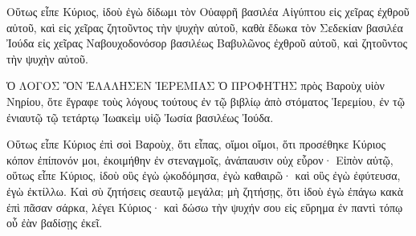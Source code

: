 {Οὕτως εἶπε Κύριος, ἰδοὺ ἐγὼ δίδωμι τὸν Οὐαφρῆ βασιλέα Αἰγύπτου εἰς χεῖρας ἐχθροῦ αὐτοῦ, καὶ εἰς χεῖρας ζητοῦντος τὴν ψυχὴν αὐτοῦ, καθὰ ἔδωκα τὸν Σεδεκίαν βασιλέα Ἰούδα εἰς χεῖρας Ναβουχοδονόσορ βασιλέως Βαβυλῶνος ἐχθροῦ αὐτοῦ, καὶ ζητοῦντος τὴν ψυχὴν αὐτοῦ.
\par }{\PP {}Ὁ ΛΟΓΟΣ ὋΝ ἘΛΑΛΗΣΕΝ ἹΕΡΕΜΙΑΣ Ὁ ΠΡΟΦΗΤΗΣ πρὸς Βαροὺχ υἱὸν Νηρίου, ὅτε ἔγραφε τοὺς λόγους τούτους ἐν τῷ βιβλίῳ ἀπὸ στόματος Ἱερεμίου, ἐν τῷ ἐνιαυτῷ τῷ τετάρτῳ Ἰωακεὶμ υἱῷ Ἰωσία βασιλέως Ἰούδα.
\par }{\PP {}Οὕτως εἶπε Κύριος ἐπὶ σοὶ Βαροὺχ,
ὅτι εἶπας, οἴμοι οἴμοι, ὅτι προσέθηκε Κύριος κόπον ἐπίπονόν μοι, ἐκοιμήθην ἐν στεναγμοῖς, ἀνάπαυσιν οὐχ εὗρον·
Εἰπὸν αὐτῷ, οὕτως εἶπε Κύριος, ἰδοὺ οὓς ἐγὼ ᾠκοδόμησα, ἐγὼ καθαιρῶ· καὶ οὓς ἐγὼ ἐφύτευσα, ἐγὼ ἐκτίλλω.
Καὶ σὺ ζητήσεις σεαυτῷ μεγάλα; μὴ ζητήσῃς, ὅτι ἰδοὺ ἐγὼ ἐπάγω κακὰ ἐπὶ πᾶσαν σάρκα, λέγει Κύριος· καὶ δώσω τὴν ψυχήν σου εἰς εὕρημα ἐν παντὶ τόπῳ οὗ ἐὰν βαδίσῃς ἐκεῖ.

}
